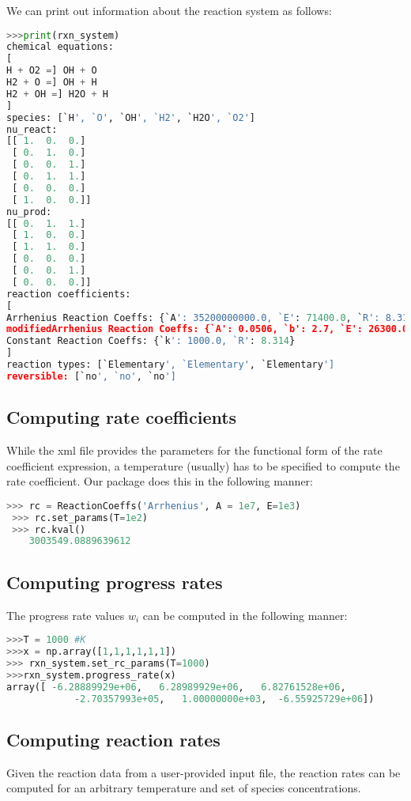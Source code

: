 \documentclass[12pt]{article}
\begin{document}
We can print out information about the reaction system as follows:
\begin{lstlisting}[language = Python, basicstyle = \ttfamily,columns = fullflexible, showstringspaces = False]
>>>print(rxn_system)
chemical equations:
[
H + O2 =] OH + O
H2 + O =] OH + H
H2 + OH =] H2O + H
]
species: [`H', `O', `OH', `H2', `H2O', `O2']
nu_react:
[[ 1.  0.  0.]
 [ 0.  1.  0.]
 [ 0.  0.  1.]
 [ 0.  1.  1.]
 [ 0.  0.  0.]
 [ 1.  0.  0.]]
nu_prod:
[[ 0.  1.  1.]
 [ 1.  0.  0.]
 [ 1.  1.  0.]
 [ 0.  0.  0.]
 [ 0.  0.  1.]
 [ 0.  0.  0.]]
reaction coefficients:
[
Arrhenius Reaction Coeffs: {`A': 35200000000.0, `E': 71400.0, `R': 8.314}
modifiedArrhenius Reaction Coeffs: {`A': 0.0506, `b': 2.7, `E': 26300.0, `R': 8.314}
Constant Reaction Coeffs: {`k': 1000.0, `R': 8.314}
]
reaction types: [`Elementary', `Elementary', `Elementary']
reversible: [`no', `no', `no']
\end{lstlisting}

\subsection{Computing rate coefficients}
While the xml file provides the parameters for the functional form of the rate coefficient expression, a temperature (usually) has to be specified to compute the rate coefficient. Our package does this in the following manner:

\begin{lstlisting}[language = Python, basicstyle = \ttfamily,columns = fullflexible, showstringspaces = False]
 >>> rc = ReactionCoeffs('Arrhenius', A = 1e7, E=1e3)
 >>> rc.set_params(T=1e2)
 >>> rc.kval()
    3003549.0889639612
\end{lstlisting}


\subsection{Computing progress rates}
The progress rate values $w_i$ can be computed in the following manner:
\begin{lstlisting}[language = Python, basicstyle = \ttfamily,columns = fullflexible, showstringspaces = False]
>>>T = 1000 #K
>>>x = np.array([1,1,1,1,1,1])
>>> rxn_system.set_rc_params(T=1000)
>>>rxn_system.progress_rate(x)
array([ -6.28889929e+06,   6.28989929e+06,   6.82761528e+06,
            -2.70357993e+05,   1.00000000e+03,  -6.55925729e+06])
\end{lstlisting}


\subsection{Computing reaction rates}
Given the reaction data from a user-provided input file, the reaction rates can be computed for an arbitrary temperature and set of species concentrations.
\end{document}
